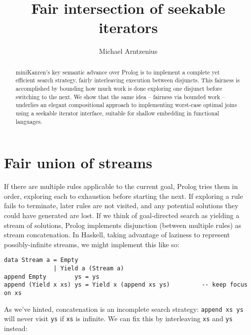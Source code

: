 \documentclass[acmsmall,screen,review,anonymous,dvipsnames,svgnames]{acmart}
\title{Fair intersection of seekable iterators}
\author{Michael Arntzenius}
\affiliation{%
	\institution{UC Berkeley}
	\city{Berkeley}
	\state{CA}
	\country{USA}
}
\newcommand\ttt\texttt
\begin{document}
\begin{abstract}
  {miniKanren}'s key semantic advance over Prolog is to implement a complete yet efficient search strategy, fairly interleaving execution between disjuncts.
  This fairness is accomplished by bounding how much work is done exploring one disjunct before switching to the next.
  We show that the same idea -- fairness via bounded work -- underlies an elegant compositional approach to implementing worst-case optimal joins using a seekable iterator interface, suitable for shallow embedding in functional languages.
\end{abstract}

\maketitle

\section{Fair union of streams}

If there are multiple rules applicable to the current goal, Prolog tries them in order, exploring each to exhaustion before starting the next.
If exploring a rule fails to terminate, later rules are not visited, and any potential solutions they could have generated are lost.
If we think of goal-directed search as yielding a stream of solutions, Prolog implements disjunction (between multiple rules) as stream concatenation.
In Haskell, taking advantage of laziness to represent possibly-infinite streams, we might implement this like so:

\begin{verbatim}
data Stream a = Empty
              | Yield a (Stream a)
append Empty        ys = ys
append (Yield x xs) ys = Yield x (append xs ys)         -- keep focus on xs
\end{verbatim}

\noindent
As we've hinted, concatenation is an incomplete search strategy: \ttt{append xs ys} will never visit \ttt{ys} if \ttt{xs} is infinite.
We can fix this by interleaving \ttt{xs} and \ttt{ys} instead:
\end{document}
